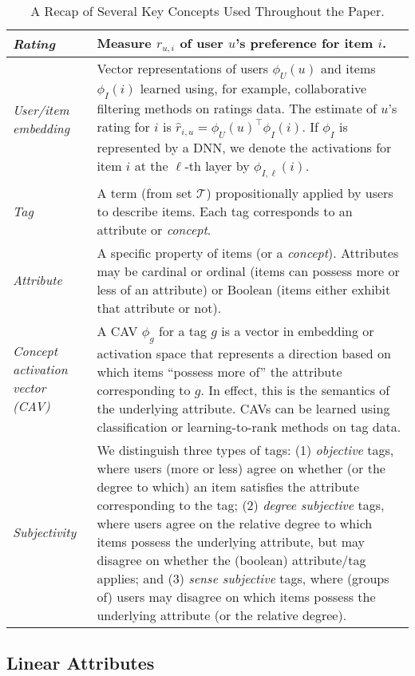 \documentclass[manuscript,screen,nonacm]{acmart}
\newcommand{\1}{{\mathbf 1}}
\newcommand{\calT}{\mathcal{T}}
\newcommand{\hatr}{\hat{r}}
\theoremstyle{TheoremNum}
\begin{document}
\begin{table}
    \centering
    \begin{tabular}{|p{2.6cm}|p{12cm}|}
    \hline
       \emph{Rating}  &  Measure $r_{u,i}$ of user $u$'s preference for item $i$.\\ \hline
       \emph{User/item embedding}  &  Vector representations of users $\phi_U(u)$ and items $\phi_I(i)$ learned using, for example, collaborative filtering methods on ratings data. The estimate of $u$'s rating for $i$ is $\hatr_{i,u} = \phi_U(u)^\top \phi_I(i)$. If $\phi_I$ is represented by a DNN, we denote the activations for item $i$ at the $\ell$-th layer by $\phi_{I,\ell}(i)$.\\ \hline
       \emph{Tag}  &  A term (from set $\calT$) propositionally applied by users to describe items. Each tag corresponds to an attribute or \emph{concept}.\\ \hline
       \emph{Attribute}  &  A specific property of items (or a \emph{concept}). Attributes may be cardinal or ordinal (items can possess more or less of an attribute) or Boolean (items either exhibit that attribute or not).\\ \hline
       \emph{Concept activation vector (CAV)}  &  A CAV $\phi_g$ for a tag $g$ is a vector in embedding or activation space that represents a direction based on which items ``possess more of'' the attribute corresponding to $g$. In effect, this is the semantics of the underlying attribute. CAVs can be learned using classification or learning-to-rank methods on tag data.\\ \hline
       \emph{Subjectivity}  & We distinguish three types of tags: (1) \emph{objective} tags, where users (more or less) agree on whether (or the degree to which) an item satisfies the attribute corresponding to the tag; (2) \emph{degree subjective} tags, where users agree on the relative degree to which items possess the underlying attribute, but may disagree on whether the (boolean) attribute/tag applies; and (3) \emph{sense subjective} tags, where (groups of) users may disagree on which items possess the underlying attribute (or the relative degree).\\ \hline
    \end{tabular}
    \vspace*{2mm}
    \caption{A Recap of Several Key Concepts Used Throughout the Paper.}
    \label{tab:keyconcepts}
\end{table}


\subsection{Linear Attributes}
\label{sec:linear}
\end{document}
